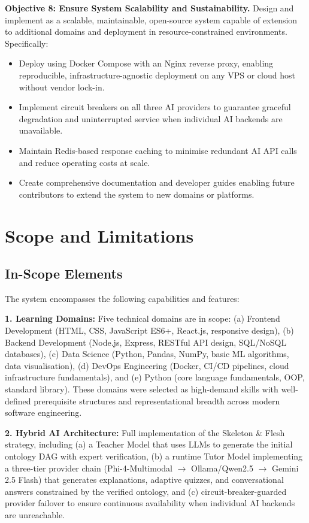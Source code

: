 \textbf{Objective 8: Ensure System Scalability and Sustainability.} Design and implement \projectname{} as a scalable, maintainable, open-source system capable of extension to additional domains and deployment in resource-constrained environments. Specifically:
\begin{itemize}
    \item Deploy using Docker Compose with an Nginx reverse proxy, enabling reproducible, infrastructure-agnostic deployment on any VPS or cloud host without vendor lock-in.
    \item Implement circuit breakers on all three AI providers to guarantee graceful degradation and uninterrupted service when individual AI backends are unavailable.
    \item Maintain Redis-based response caching to minimise redundant AI API calls and reduce operating costs at scale.
    \item Create comprehensive documentation and developer guides enabling future contributors to extend the system to new domains or platforms.
\end{itemize}

\section{Scope and Limitations}
\label{sec:scope-limitations}

\subsection{In-Scope Elements}

The \projectname{} system encompasses the following capabilities and features:

\textbf{1. Learning Domains:} Five technical domains are in scope: (a) Frontend Development (HTML, CSS, JavaScript ES6+, React.js, responsive design), (b) Backend Development (Node.js, Express, RESTful API design, SQL/NoSQL databases), (c) Data Science (Python, Pandas, NumPy, basic ML algorithms, data visualisation), (d) DevOps Engineering (Docker, CI/CD pipelines, cloud infrastructure fundamentals), and (e) Python (core language fundamentals, OOP, standard library). These domains were selected as high-demand skills with well-defined prerequisite structures and representational breadth across modern software engineering.

\textbf{2. Hybrid AI Architecture:} Full implementation of the Skeleton \& Flesh strategy, including (a) a Teacher Model that uses LLMs to generate the initial ontology DAG with expert verification, (b) a runtime Tutor Model implementing a three-tier provider chain (Phi-4-Multimodal $\to$ Ollama/Qwen2.5 $\to$ Gemini 2.5 Flash) that generates explanations, adaptive quizzes, and conversational answers constrained by the verified ontology, and (c) circuit-breaker-guarded provider failover to ensure continuous availability when individual AI backends are unreachable.

